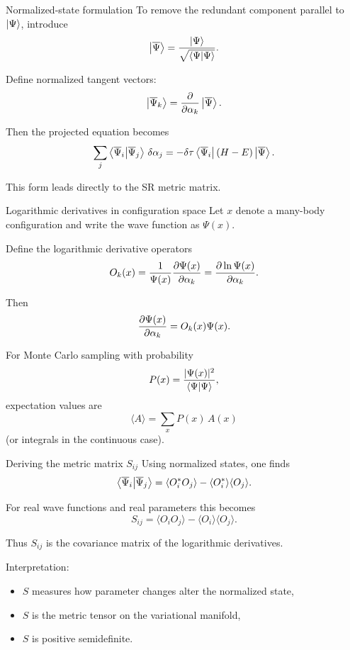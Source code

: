 \documentclass[aspectratio=169]{beamer}
\begin{document}
\begin{frame}{Normalized-state formulation}
To remove the redundant component parallel to \(\ket{\Psi}\), introduce
\[
\ket{\overline{\Psi}}=\frac{\ket{\Psi}}{\sqrt{\braket{\Psi}{\Psi}}}.
\]

Define normalized tangent vectors:
\[
\ket{\overline{\Psi}_k}
=
\pdv{}{\alpha_k}\ket{\overline{\Psi}}.
\]

Then the projected equation becomes
\[
\sum_j
\braket{\overline{\Psi}_i}{\overline{\Psi}_j}
\,\delta\alpha_j
=
-\delta\tau
\bra{\overline{\Psi}_i}(H-E)\ket{\overline{\Psi}}.
\]

This form leads directly to the SR metric matrix.
\end{frame}

\begin{frame}{Logarithmic derivatives in configuration space}
Let \(x\) denote a many-body configuration and write the wave function as \(\Psi(x)\).

Define the logarithmic derivative operators
\[
O_k(x)
=
\frac{1}{\Psi(x)}
\pdv{\Psi(x)}{\alpha_k}
=
\pdv{\ln \Psi(x)}{\alpha_k}.
\]

Then
\[
\pdv{\Psi(x)}{\alpha_k}=O_k(x)\Psi(x).
\]

For Monte Carlo sampling with probability
\[
P(x)=\frac{|\Psi(x)|^2}{\braket{\Psi}{\Psi}},
\]
expectation values are
\[
\langle A \rangle = \sum_x P(x)\, A(x)
\]
(or integrals in the continuous case).
\end{frame}

\begin{frame}{Deriving the metric matrix \(S_{ij}\)}
Using normalized states, one finds
\[
\braket{\overline{\Psi}_i}{\overline{\Psi}_j}
=
\langle O_i^\ast O_j\rangle
-
\langle O_i^\ast\rangle \langle O_j\rangle.
\]

For real wave functions and real parameters this becomes
\[
S_{ij}
=
\langle O_i O_j\rangle
-
\langle O_i\rangle \langle O_j\rangle.
\]

Thus \(S_{ij}\) is the covariance matrix of the logarithmic derivatives.

\medskip

Interpretation:
\begin{itemize}
\item \(S\) measures how parameter changes alter the normalized state,
\item \(S\) is the metric tensor on the variational manifold,
\item \(S\) is positive semidefinite.
\end{itemize}
\end{frame}
\end{document}
